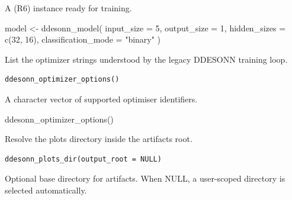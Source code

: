 \documentclass[a4paper]{book}
\begin{document}
%
\begin{Value}
A  (R6) instance ready for training.
\end{Value}
%
\begin{SeeAlso}
\end{SeeAlso}
%
\begin{Examples}
\begin{ExampleCode}
model <- ddesonn_model(
  input_size = 5,
  output_size = 1,
  hidden_sizes = c(32, 16),
  classification_mode = "binary"
)

\end{ExampleCode}
\end{Examples}
%
\begin{Description}
List the optimizer strings understood by the legacy DDESONN
training loop.
\end{Description}
%
\begin{Usage}
\begin{verbatim}
ddesonn_optimizer_options()
\end{verbatim}
\end{Usage}
%
\begin{Value}
A character vector of supported optimiser identifiers.
\end{Value}
%
\begin{Examples}
\begin{ExampleCode}
ddesonn_optimizer_options()

\end{ExampleCode}
\end{Examples}
%
\begin{Description}
Resolve the plots directory inside the artifacts root.
\end{Description}
%
\begin{Usage}
\begin{verbatim}
ddesonn_plots_dir(output_root = NULL)
\end{verbatim}
\end{Usage}
%
\begin{Arguments}
\begin{ldescription}
\item[\code{output\_root}] Optional base directory for artifacts. When NULL, a
user-scoped directory is selected automatically.
\end{ldescription}
\end{Arguments}
\end{document}
